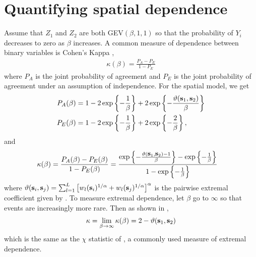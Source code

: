 \documentclass[11pt]{article}
\begin{document}

\section{Quantifying spatial dependence} \label{rbs:spatdep}
Assume that $Z_1$ and $Z_2$ are both GEV$(\beta, 1, 1)$ so that the probability of $Y_i$ decreases to zero as $\beta$ increases.
A common measure of dependence between binary variables is Cohen's Kappa \citep{Cohen1960},
\begin{align}
  \kappa(\beta) = \frac{P_A - P_E}{1 - P_E}
\end{align}
where $P_A$ is the joint probability of agreement and $P_E$ is the joint probability of agreement under an assumption of independence.
For the spatial model, we get
\begin{align*}
  P_A(\beta) &= 1 - 2 \exp\left\{ -\frac{1}{\beta} \right\} + 2 \exp\left\{-\frac{\vartheta(\mbox{\bf s}_1, \mbox{\bf s}_2)}{\beta}  \right\} \nonumber \\
  P_E(\beta) &= 1 - 2 \exp \left\{ -\frac{1}{\beta} \right\} + 2 \exp \left\{ -\frac{2}{\beta} \right\}, \nonumber
\end{align*}
and
\begin{align} \label{rbeq:kappa}
  \kappa(\beta) &= \frac{P_A(\beta) - P_E(\beta)}{1 - P_E(\beta)} = \frac{\exp\left\{-\frac{\vartheta(\mbox{\bf s}_1, \mbox{\bf s}_2) - 1}{\beta}  \right\} - \exp \left\{ -\frac{1}{\beta} \right\}}{1 - \exp \left\{ -\frac{1}{\beta} \right\}}
\end{align}
where $\vartheta (\mbox{\bf s}_i, \mbox{\bf s}_j) = \sum_{ l = 1 }^{ L } \left[ w_{l}(\mbox{\bf s}_i)^{ 1/\alpha } +  w_{ l}(\mbox{\bf s}_j)^{ 1/\alpha } \right]^\alpha$ is the pairwise extremal coefficient given by \citet{Reich2012}.
To measure extremal dependence, let $\beta$ go to $\infty$ so that events are increasingly more rare.
Then as shown in ,
\begin{align}
  \kappa = \lim_{\beta \rightarrow \infty} \kappa(\beta) = 2 - \vartheta(\mbox{\bf s}_1, \mbox{\bf s}_2)
\end{align}
which is the same as the $\chi$ statistic of \citet{Coles1999}, a commonly used measure of extremal dependence.
\end{document}
